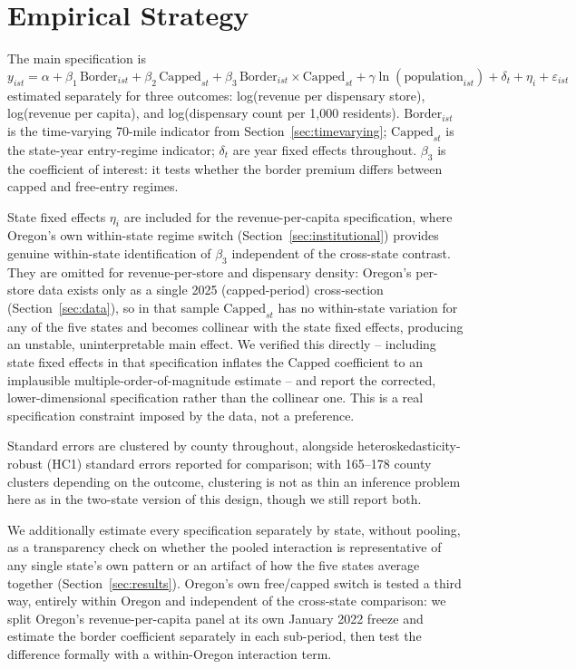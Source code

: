 \documentclass[12pt]{article}
\begin{document}
\section{Empirical Strategy}
\label{sec:methods}

The main specification is
\[
y_{ist} = \alpha + \beta_1 \, \text{Border}_{ist} + \beta_2 \, \text{Capped}_{st} + \beta_3\,
\text{Border}_{ist} \times \text{Capped}_{st} + \gamma \ln(\text{population}_{ist}) + \delta_t + \eta_i + \varepsilon_{ist}
\]
estimated separately for three outcomes: log(revenue per dispensary store), log(revenue per capita), and
log(dispensary count per 1{,}000 residents). $\text{Border}_{ist}$ is the time-varying 70-mile indicator from
Section~\ref{sec:timevarying}; $\text{Capped}_{st}$ is the state-year entry-regime indicator; $\delta_t$ are
year fixed effects throughout. $\beta_3$ is the coefficient of interest: it tests whether the border premium
differs between capped and free-entry regimes.

State fixed effects $\eta_i$ are included for the revenue-per-capita specification, where Oregon's own
within-state regime switch (Section~\ref{sec:institutional}) provides genuine within-state identification of
$\beta_3$ independent of the cross-state contrast. They are omitted for revenue-per-store and dispensary
density: Oregon's per-store data exists only as a single 2025 (capped-period) cross-section
(Section~\ref{sec:data}), so in that sample $\text{Capped}_{st}$ has no within-state variation for any of the
five states and becomes collinear with the state fixed effects, producing an unstable, uninterpretable main
effect. We verified this directly -- including state fixed effects in that specification inflates the
$\text{Capped}$ coefficient to an implausible multiple-order-of-magnitude estimate -- and report the corrected,
lower-dimensional specification rather than the collinear one. This is a real specification constraint imposed
by the data, not a preference.

Standard errors are clustered by county throughout, alongside heteroskedasticity-robust (HC1) standard errors
reported for comparison; with 165--178 county clusters depending on the outcome, clustering is not as thin an
inference problem here as in the two-state version of this design, though we still report both.

We additionally estimate every specification separately by state, without pooling, as a transparency check on
whether the pooled interaction is representative of any single state's own pattern or an artifact of how the
five states average together (Section~\ref{sec:results}). Oregon's own free/capped switch is tested a third
way, entirely within Oregon and independent of the cross-state comparison: we split Oregon's revenue-per-capita
panel at its own January 2022 freeze and estimate the border coefficient separately in each sub-period, then
test the difference formally with a within-Oregon interaction term.
\end{document}

